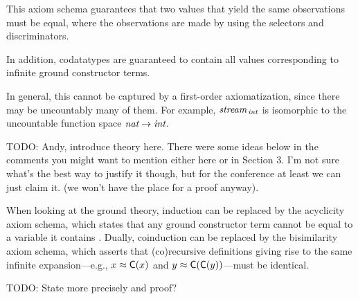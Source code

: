 This axiom schema guarantees that two values that yield the same
observations must be equal, where the observations are made by using the
selectors and discriminators.
%
\begin{report}\par\end{report}
In addition, codatatypes are guaranteed to contain all values corresponding to
infinite ground constructor terms.
\begin{report}
In general, this cannot be captured by a
first-order axiomatization, since there may be uncountably many of them.
For example, $\textit{stream}_{\,\textit{int}}$ is isomorphic to the uncountable
function space $\textit{nat} \to \textit{int}$.
\end{report}

TODO: Andy, introduce theory here. There were some ideas below in the comments
you might want to mention either here or in Section 3. I'm not sure what's the
best way to justify it though, but for the conference at least we can just claim it. (we
won't have the place for a proof anyway).

When looking at the ground theory, induction can be replaced by the acyclicity
axiom schema, which states that any ground constructor term cannot be equal to
a variable it contains \cite{xxx}. Dually, coinduction can be replaced by the
bisimilarity axiom schema, which asserts that (co)recursive definitions giving
rise to the same infinite expansion---e.g., $x \approx \textsf{C}(x)$ and $y \approx
\textsf{C}(\textsf{C}(y))$---must be identical.

\begin{report}
TODO: State more precisely and proof?
\end{report}



